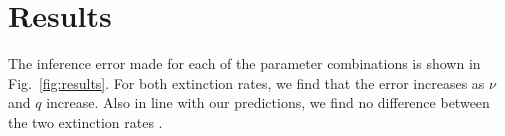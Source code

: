 \section{Results}

The inference error made for each of the parameter combinations
is shown in Fig.~\ref{fig:results}. For both extinction rates,
we find that the error increases as $\nu$
and $q$ increase. Also in line with our predictions, we find no difference
between the two extinction rates .

